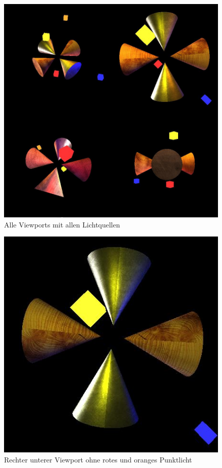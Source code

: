\documentclass{scrartcl}
\begin{document}
        \begin{figure}[!htpb]
            \centering
            \includegraphics[scale=0.25]{scrshot2.jpg}
            \caption*{Alle Viewports mit allen Lichtquellen}
        \end{figure}
        \begin{figure}[!htpb]
            \centering
            \includegraphics[scale=0.5]{scrshot3.jpg}
            \caption*{Rechter unterer Viewport ohne rotes und oranges Punktlicht}
        \end{figure}
\end{document}
